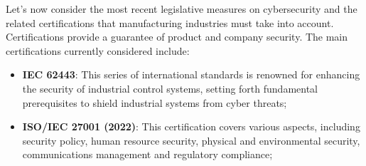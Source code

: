 Let's now consider the most recent legislative measures on cybersecurity and the related certifications that manufacturing industries must take into account.\\
Certifications provide a guarantee of product and company security. The main certifications currently considered include:
\begin{itemize}
  \item \textbf{IEC 62443}: This series of international standards is renowned for enhancing the security of industrial control systems, setting forth fundamental prerequisites to shield industrial systems from cyber threats;
  \item \textbf{ISO/IEC 27001 (2022)}: This certification covers various aspects, including security policy, human resource security, physical and environmental security, communications management and regulatory compliance;
\end{itemize}

